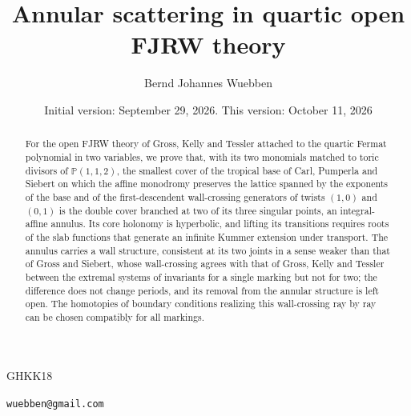 \documentclass[11pt]{amsart}
\title[Annular scattering in open FJRW theory]
{Annular scattering in quartic open FJRW theory}
\author{Bernd Johannes Wuebben}
\date{Initial version: September 29, 2026. This version: October 11, 2026}
\theoremstyle{definition}
\theoremstyle{remark}
\newcommand{\PP}{\mathbb P}
\begin{document}
\begin{abstract}
For the open FJRW theory of Gross, Kelly and Tessler attached to the quartic
Fermat polynomial in two variables, we prove that, with its two monomials
matched to toric divisors of $\PP(1,1,2)$, the smallest cover of the tropical
base of Carl, Pumperla and Siebert on which the affine monodromy preserves the
lattice spanned by the exponents of the base and of the first-descendent wall-crossing generators of
twists $(1,0)$ and $(0,1)$ is the double cover branched at two of its three
singular points, an integral-affine annulus.  Its core holonomy is
hyperbolic, and lifting its transitions requires roots of the slab functions
that generate an infinite Kummer extension under transport.  The annulus
carries a wall structure, consistent at its two joints in a sense weaker than
that of Gross and Siebert, whose wall-crossing agrees with that of Gross,
Kelly and Tessler between the extremal systems of invariants for a single
marking but not for two; the difference does not change periods, and its
removal from the annular structure is left open.  The homotopies of boundary
conditions realizing this wall-crossing ray by ray can be chosen compatibly
for all markings.
\end{abstract}

\maketitle









\appendix







\begin{thebibliography}{GHKK18}

\end{thebibliography}

\bigskip
{} \texttt{wuebben@gmail.com}
\end{document}

